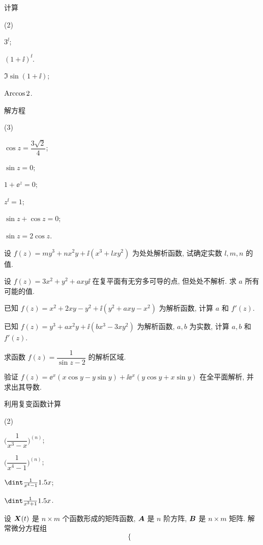 \begin{homework}
\begin{homework}
    \item 计算
      \begin{subhomework}(2)
        \item $3^\ii$;
        \item $(1+\ii)^\ii$.
        \item $\Im\sin(1+\ii)$;
        \item $\operatorname{Arccos} 2$.
      \end{subhomework}
    \item 解方程 
      \begin{subhomework}(3)
        \item $\cos z=\dfrac{3\sqrt2}4$;
        \item $\sin z=0$;
        \item $1+\ee^z=0$;
        \item $z^\ii=1$;
        \item $\sin z+\cos z=0$;
        \item $\sin z=2\cos z$.
      \end{subhomework}
    \item 设 $f(z)=my^3+nx^2y+\ii(x^3+lxy^2)$ 为处处解析函数, 试确定实数 $l,m,n$ 的值.
    \item 设 $f(z)=3x^2+y^2+axy\ii$ 在复平面有无穷多可导的点, 但处处不解析. 求 $a$ 所有可能的值.
    \item 已知 $f(z)=x^2+2xy-y^2+\ii(y^2+axy-x^2)$ 为解析函数, 计算 $a$ 和 $f'(z)$.
    \item 已知 $f(z)=y^3+ax^2y+\ii(bx^3-3xy^2)$ 为解析函数, $a,b$ 为实数, 计算 $a,b$ 和 $f'(z)$.  
    \item 求函数 $f(z)=\dfrac{1}{\sin z-2}$ 的解析区域.
    \item 验证 $f(z)=\ee^x(x\cos y-y\sin y)+\ii \ee^x(y\cos y+x\sin y)$ 在全平面解析, 并求出其导数.
    \item \optionalex 利用复变函数计算
      \begin{subhomework}(2)
        \item $\biggl(\dfrac1{x^3-x}\biggr)^{(n)}$;
        \item $\biggl(\dfrac1{x^4-1}\biggr)^{(n)}$;
        \item $\dint \frac1{x^4-1}\d x$;
        \item $\dint \frac1{x^3+1}\d x$.
      \end{subhomework}
    \item \optionalex 设 ${\boldsymbol{X}}(t)$ 是 $n\times m$ 个函数形成的矩阵函数, ${\boldsymbol{A}}$ 是 $n$ 阶方阵, ${\boldsymbol{B}}$ 是 $n\times m$ 矩阵. 解常微分方程组
      \[
        \begin{cases}

\end{cases}\]
\end{homework}
\end{homework}
